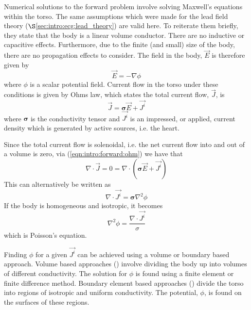 Numerical solutions to the forward problem involve solving Maxwell's equations
within the torso.
The same assumptions which were made for the lead field theory
($\S$\ref{sec:intro:ecg:lead_theory}) are valid here.
To reiterate them briefly, they state that the body is a linear volume
conductor.
There are no inductive or capacitive effects.
Furthermore, due to the finite (and small) size of the body, there are no
propagation effects to consider.
The field in the body, $\vec{E}$ is therefore given by
\begin{equation}
\label{eqn:intro:forward:maxwell}
\vec{E} = -\nabla\phi
\end{equation}
where $\phi$ is a scalar potential field.
Current flow in the torso under these conditions is given by Ohms law, which
states the total current flow, $\vec{J}$, is
\begin{equation}
\label{eqn:intro:forward:ohm}
\vec{J} = \mathbf{\sigma}\vec{E} + \vec{J^i}
\end{equation}
where $\mathbf{\sigma}$ is the conductivity tensor and $\vec{J^i}$ is an
impressed, or applied, current density which is generated by active sources,
i.e. the heart.

Since the total current flow is solenoidal, i.e. the net current flow into and
out of a volume is zero, via (\ref{eqn:intro:forward:ohm}) we have that
\begin{equation}
\label{eqn:intro:forward:ohm2}
\nabla\cdot\vec{J} = 0 = \nabla\cdot\left(\mathbf{\sigma}\vec{E} + \vec{J^i} \right)
\end{equation}
This can alternatively be written as
\begin{equation}
\label{eqn:intro:forward:poisson}
\nabla\cdot\vec{J^i} = \mathbf{\sigma}\nabla^2\phi
\end{equation}
If the body is homogeneous and isotropic, it becomes
\begin{equation}
\label{eqn:intro:forward:poisson2}
\nabla^2\phi = \frac{\nabla\cdot\vec{J^i}}{\sigma}
\end{equation}
which is Poisson's equation.

Finding $\phi$ for a given $\vec{J^i}$ can be achieved using a volume or
boundary based approach.
Volume based approaches (\cite{Seger2004,Klepfer1997,Keller2007}) involve dividing the body
up into volumes of different conductivity.
The solution for $\phi$ is found using a finite element or finite difference
method.
Boundary element based approaches
(\cite{Barr1966,Clayton2002,Gulranjani1989,Weixue1996}) divide the torso into
regions of isotropic and uniform conductivity.
The potential, $\phi$, is found on the surfaces of these regions.

